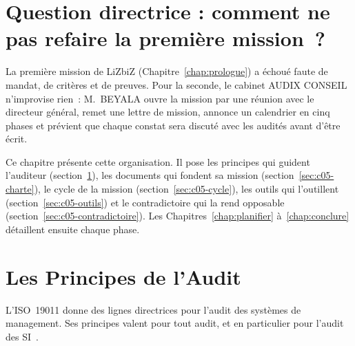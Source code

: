 \section*{Question directrice : comment ne pas refaire la première mission~?}

La première mission de LiZbiZ (Chapitre~\ref{chap:prologue}) a échoué
faute de mandat, de critères et de preuves. Pour la seconde, le cabinet
AUDIX CONSEIL n'improvise rien~: M.~BEYALA ouvre la mission par une réunion
avec le directeur général, remet une lettre de mission, annonce un
calendrier en cinq phases et prévient que chaque constat sera discuté avec
les audités avant d'être écrit.

Ce chapitre présente cette organisation. Il pose les principes qui guident
l'auditeur (section~\ref{sec:c05-principes}), les documents qui fondent sa
mission (section~\ref{sec:c05-charte}), le cycle de la mission
(section~\ref{sec:c05-cycle}), les outils qui l'outillent
(section~\ref{sec:c05-outils}) et le contradictoire qui la rend opposable
(section~\ref{sec:c05-contradictoire}). Les Chapitres~\ref{chap:planifier}
à~\ref{chap:conclure} détaillent ensuite chaque phase.

\separateur

\section{Les Principes de l'Audit}
\label{sec:c05-principes}

L'ISO~19011 donne des lignes directrices pour l'audit des systèmes de
management. Ses principes valent pour tout audit, et en particulier pour
l'audit des SI~\cite{iso19011_2018}.


